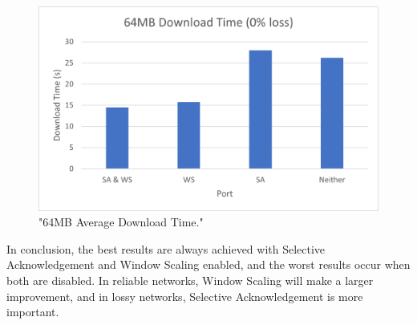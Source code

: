 \documentclass[12pt]{article}
\begin{document}
\begin{figure}[!htbp]
  \centering
  \includegraphics[width=\linewidth]{64MB-no-loss-download-time.png}
  \caption{"64MB Average Download Time."}
  \label{figure16: 64MB Average Download Time}
\end{figure}

In conclusion, the best results are always achieved with Selective Acknowledgement and Window Scaling enabled, and the worst results occur when both are disabled.
In reliable networks, Window Scaling will make a larger improvement, and in lossy networks, Selective Acknowledgement is more important.
\end{document}

